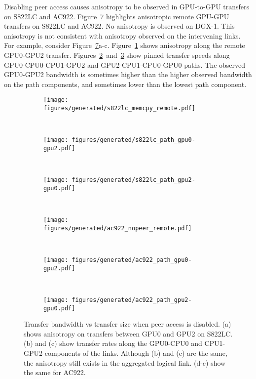 Disabling peer access causes anisotropy to be observed in GPU-to-GPU transfers on S822LC and AC922.
Figure~\ref{fig:explicit-peer-anisotropy} highlights anisotropic remote GPU-GPU transfers on S822LC and AC922.
No anisotropy is observed on DGX-1.
This anisotropy is not consistent with anisotropy observed on the intervening links.
For example, consider Figure~\ref{fig:explicit-peer-anisotropy}a-c.
Figure~\ref{fig:minsky-explicit-nopeer-remote} shows anisotropy along the remote GPU0-GPU2 transfer.
Figures~\ref{fig:minsky-explicit-path-gpu0-gpu2}~and~\ref{fig:minsky-explicit-path-gpu2-gpu0} show pinned transfer speeds along GPU0-CPU0-CPU1-GPU2 and GPU2-CPU1-CPU0-GPU0 paths.
The observed GPU0-GPU2 bandwidth is sometimes higher than the higher observed bandwidth on the path components, and sometimes lower than the lowest path component.


\begin{figure}[ht]
	\centering
	\begin{subfigure}[b]{0.3\textwidth}
		\texttt{[image: figures/generated/s822lc\_memcpy\_remote.pdf]}
		\caption{}
		\label{fig:minsky-explicit-nopeer-remote}
	\end{subfigure}
	~
	\begin{subfigure}[b]{0.3\textwidth}
		\texttt{[image: figures/generated/s822lc\_path\_gpu0-gpu2.pdf]}
		\caption{}
		\label{fig:minsky-explicit-path-gpu0-gpu2}
	\end{subfigure}
	~
	\begin{subfigure}[b]{0.3\textwidth}
		\texttt{[image: figures/generated/s822lc\_path\_gpu2-gpu0.pdf]}
		\caption{}
		\label{fig:minsky-explicit-path-gpu2-gpu0}
	\end{subfigure}
	\\
	\begin{subfigure}[b]{0.3\textwidth}
		\texttt{[image: figures/generated/ac922\_nopeer\_remote.pdf]}
		\caption{}
		\label{fig:explicit-ac922-nopeer-remote}
	\end{subfigure}
	~
	\begin{subfigure}[b]{0.3\textwidth}
		\texttt{[image: figures/generated/ac922\_path\_gpu0-gpu2.pdf]}
		\caption{}
		\label{fig:ac922-explicit-path-gpu0-gpu2}
	\end{subfigure}
	~
	\begin{subfigure}[b]{0.3\textwidth}
		\texttt{[image: figures/generated/ac922\_path\_gpu2-gpu0.pdf]}
		\caption{}
		\label{fig:ac922-explicit-path-gpu2-gpu0}
	\end{subfigure}
	\caption[Peer Access and GPU-GPU Transfer Bandwidth]{
		Transfer bandwidth vs transfer size when peer access is disabled.
		(a) shows anisotropy on transfers between GPU0 and GPU2 on S822LC.
		(b) and (c) show transfer rates along the GPU0-CPU0 and CPU1-GPU2 components of the links.
		Although (b) and (c) are the same, the anisotropy still exists in the aggregated logical link.
		(d-c) show the same for AC922.
	}
	\label{fig:explicit-peer-anisotropy}
\end{figure}

